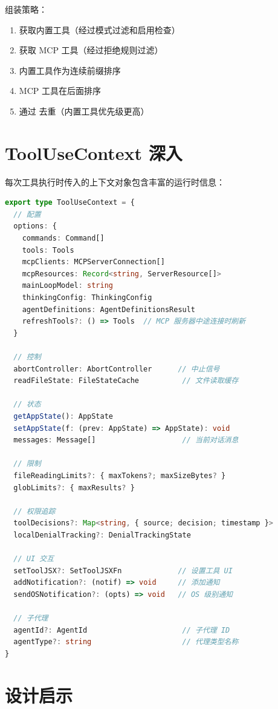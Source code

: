 组装策略：
\begin{enumerate}[nosep]
  \item 获取内置工具（经过模式过滤和启用检查）
  \item 获取 MCP 工具（经过拒绝规则过滤）
  \item 内置工具作为连续前缀排序
  \item MCP 工具在后面排序
  \item 通过  去重（内置工具优先级更高）
\end{enumerate}

\section{ToolUseContext 深入}

每次工具执行时传入的上下文对象包含丰富的运行时信息：

\begin{lstlisting}[language=TypeScript,breaklines=true]
export type ToolUseContext = {
  // 配置
  options: {
    commands: Command[]
    tools: Tools
    mcpClients: MCPServerConnection[]
    mcpResources: Record<string, ServerResource[]>
    mainLoopModel: string
    thinkingConfig: ThinkingConfig
    agentDefinitions: AgentDefinitionsResult
    refreshTools?: () => Tools  // MCP 服务器中途连接时刷新
  }
  
  // 控制
  abortController: AbortController      // 中止信号
  readFileState: FileStateCache          // 文件读取缓存
  
  // 状态
  getAppState(): AppState
  setAppState(f: (prev: AppState) => AppState): void
  messages: Message[]                    // 当前对话消息

  // 限制
  fileReadingLimits?: { maxTokens?; maxSizeBytes? }
  globLimits?: { maxResults? }
  
  // 权限追踪
  toolDecisions?: Map<string, { source; decision; timestamp }>
  localDenialTracking?: DenialTrackingState
  
  // UI 交互
  setToolJSX?: SetToolJSXFn             // 设置工具 UI
  addNotification?: (notif) => void     // 添加通知
  sendOSNotification?: (opts) => void   // OS 级别通知
  
  // 子代理
  agentId?: AgentId                      // 子代理 ID
  agentType?: string                     // 代理类型名称
}
\end{lstlisting}

\section{设计启示}


